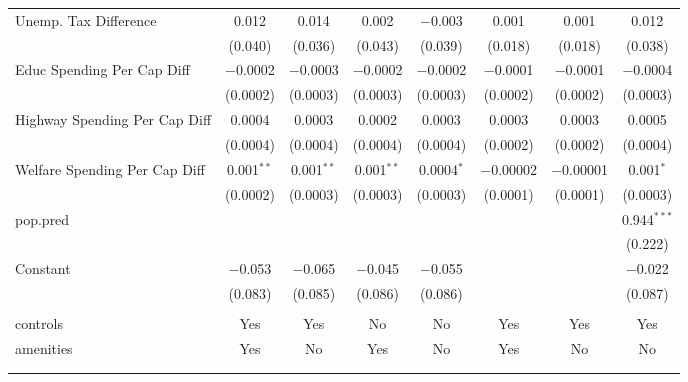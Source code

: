 \begin{table}[!htbp]
\begin{tabular}{@{\extracolsep{5pt}}lccccccc}
  Unemp. Tax Difference & 0.012 & 0.014 & 0.002 & $-$0.003 & 0.001 & 0.001 & 0.012 \\ 
  & (0.040) & (0.036) & (0.043) & (0.039) & (0.018) & (0.018) & (0.038) \\ 
  Educ Spending Per Cap Diff & $-$0.0002 & $-$0.0003 & $-$0.0002 & $-$0.0002 & $-$0.0001 & $-$0.0001 & $-$0.0004 \\ 
  & (0.0002) & (0.0003) & (0.0003) & (0.0003) & (0.0002) & (0.0002) & (0.0003) \\ 
  Highway Spending Per Cap Diff & 0.0004 & 0.0003 & 0.0002 & 0.0003 & 0.0003 & 0.0003 & 0.0005 \\ 
  & (0.0004) & (0.0004) & (0.0004) & (0.0004) & (0.0002) & (0.0002) & (0.0004) \\ 
  Welfare Spending Per Cap Diff & 0.001$^{**}$ & 0.001$^{**}$ & 0.001$^{**}$ & 0.0004$^{*}$ & $-$0.00002 & $-$0.00001 & 0.001$^{*}$ \\ 
  & (0.0002) & (0.0003) & (0.0003) & (0.0003) & (0.0001) & (0.0001) & (0.0003) \\ 
  pop.pred &  &  &  &  &  &  & 0.944$^{***}$ \\ 
  &  &  &  &  &  &  & (0.222) \\ 
  Constant & $-$0.053 & $-$0.065 & $-$0.045 & $-$0.055 &  &  & $-$0.022 \\ 
  & (0.083) & (0.085) & (0.086) & (0.086) &  &  & (0.087) \\ 
 \hline \\[-1.8ex] 
controls & Yes & Yes & No & No & Yes & Yes & Yes \\ 
amenities & Yes & No & Yes & No & Yes & No & No \\ 
\hline \\[-1.8ex] 
\hline 
\hline \\[-1.8ex] 
\end{tabular} 
\end{table} 
